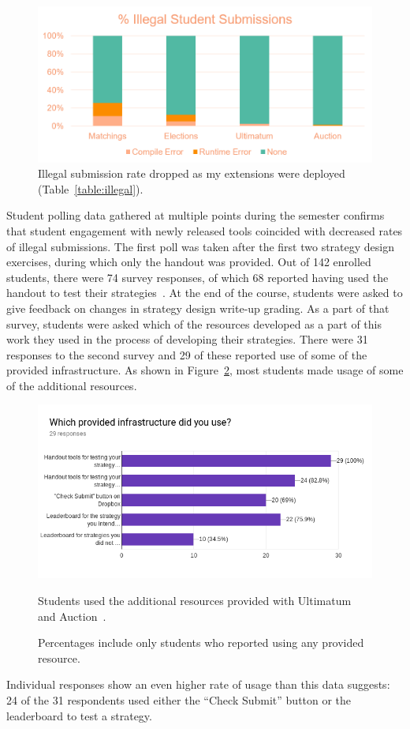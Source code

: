 \documentclass[pageno]{jpaper}
\begin{document}
\begin{figure}[hbt]
  \centering
  \includegraphics[width=0.75\linewidth]{illegal.png}
  \caption{Illegal submission rate dropped as my extensions were deployed (Table~\ref{table:illegal}).}\label{fig:illegal}
\end{figure}

Student polling data gathered at multiple points during the semester confirms that student engagement with newly released tools coincided with decreased rates of illegal submissions.
The first poll was taken after the first two strategy design exercises, during which only the handout was provided.
Out of 142 enrolled students, there were 74 survey responses, of which 68 reported having used the handout to test their strategies~\cite{survey12}.
At the end of the course, students were asked to give feedback on changes in strategy design write-up grading.
As a part of that survey, students were asked which of the resources developed as a part of this work they used in the process of developing their strategies.
There were 31 responses to the second survey and 29 of these reported use of some of the provided infrastructure.
As shown in Figure~\ref{fig:usage2}, most students made usage of some of the additional resources.
\begin{figure}[hbt]
  \centering
  \includegraphics[width=0.75\linewidth]{usage2.png}
  \caption{Students used the additional resources provided with Ultimatum and Auction~\cite{survey34}.}\label{fig:usage2}
  \caption*{Percentages include only students who reported using any provided resource.}
\end{figure}
Individual responses show an even higher rate of usage than this data suggests: 24 of the 31 respondents used either the ``Check Submit'' button or the leaderboard to test a strategy.
\end{document}
